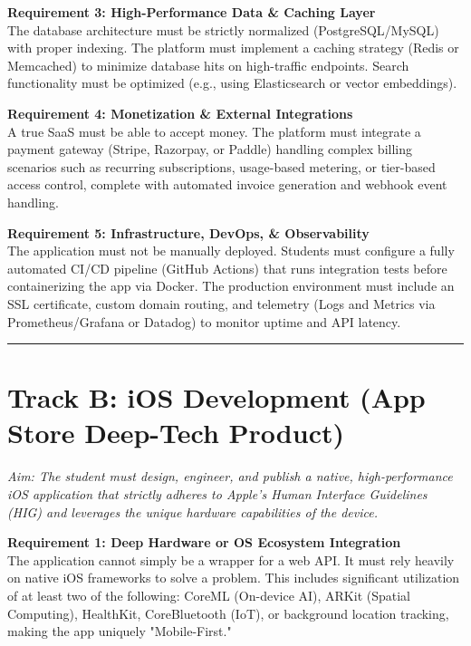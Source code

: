 \vspace{0.3cm}

\noindent\textbf{Requirement 3: High-Performance Data \& Caching Layer} \\
The database architecture must be strictly normalized (PostgreSQL/MySQL) with proper indexing. The platform must implement a caching strategy (Redis or Memcached) to minimize database hits on high-traffic endpoints. Search functionality must be optimized (e.g., using Elasticsearch or vector embeddings).

\vspace{0.3cm}

\noindent\textbf{Requirement 4: Monetization \& External Integrations} \\
A true SaaS must be able to accept money. The platform must integrate a payment gateway (Stripe, Razorpay, or Paddle) handling complex billing scenarios such as recurring subscriptions, usage-based metering, or tier-based access control, complete with automated invoice generation and webhook event handling.

\vspace{0.3cm}

\noindent\textbf{Requirement 5: Infrastructure, DevOps, \& Observability} \\
The application must not be manually deployed. Students must configure a fully automated CI/CD pipeline (GitHub Actions) that runs integration tests before containerizing the app via Docker. The production environment must include an SSL certificate, custom domain routing, and telemetry (Logs and Metrics via Prometheus/Grafana or Datadog) to monitor uptime and API latency.

\vspace{0.5cm}
\hrule
\vspace{0.5cm}

\section*{Track B: iOS Development (App Store Deep-Tech Product)}
\noindent \textit{Aim: The student must design, engineer, and publish a native, high-performance iOS application that strictly adheres to Apple’s Human Interface Guidelines (HIG) and leverages the unique hardware capabilities of the device.}

\vspace{0.3cm}

\noindent\textbf{Requirement 1: Deep Hardware or OS Ecosystem Integration} \\
The application cannot simply be a wrapper for a web API. It must rely heavily on native iOS frameworks to solve a problem. This includes significant utilization of at least two of the following: CoreML (On-device AI), ARKit (Spatial Computing), HealthKit, CoreBluetooth (IoT), or background location tracking, making the app uniquely "Mobile-First."

